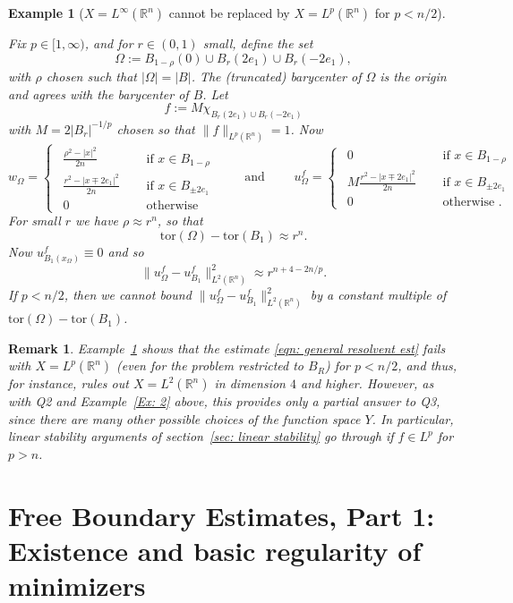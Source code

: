 \documentclass[10pt, reqno]{amsart}
\numberwithin{equation}{section}
\newtheorem{remark}[theorem]{Remark}
\newtheorem{example}[theorem]{Example}
\def\R{{\mathbb R}}
\def\W{\Omega}
\def\tor{\mathrm{tor}}
\begin{document}
\begin{example}[$X=L^{\infty}(\R^n)$ cannot be replaced by $X= L^p (\R^n)$ for $p<n/2$]\label{Ex: 3}
    {\rm
    Fix $p \in [1,\infty)$, and for $r\in (0,1)$ small, define the set
\[
\Omega:= B_{1-\rho}(0) \cup B_r(2e_1) \cup B_r(-2e_1),
\]
with $\rho$ chosen such that $|\Omega|=|B|$. The (truncated) barycenter of $\Omega$ is the origin and agrees with the barycenter of $B$. Let  
$$f:=M\chi_{B_r(2e_1)\cup B_r(-2e_1)}$$
with $M=2|B_r|^{-1/p}$ chosen so that $\|f \|_{L^p(\mathbb{R}^n)}=1$. Now 
\[
w_{\W}=
\begin{cases}
\ \  \frac{\rho^2-|x|^2}{2n} \quad &\text{ if } x \in B_{1-\rho} \\
\ \  \frac{r^2-|x\mp 2e_1|^2}{2n} \quad &\text{ if } x \in B_{\pm 2e_1} \\
\ \ 0 \quad &\text{ otherwise } 
\end{cases}
\qquad \text{ and } \qquad 
u_{\W}^f=
\begin{cases}
 \ \ 
 0 \quad &\text{ if } x \in B_{1-\rho} \\
 \ \ M\frac{r^2-|x\mp 2e_1|^2}{2n} \quad & \text{ if } x \in B_{\pm 2e_1} \\
  \ \ 0 \quad  &\text{ otherwise }. 
\end{cases}
\]
For small $r$ we have $\rho \approx r^n$, so that 
\[
\tor({\W})-\tor(B_1) \approx r^n. 
\]
Now $u_{B_1(x_{\W})}^f \equiv 0$ and so 
\[
 \|u_{\W}^f - u_{B_1}^f \|_{L^2(\mathbb{R}^n)}^2 \approx r^{n+4-2n/p}. 
\]
If $p< n/2$, then we cannot bound  $\|u_{\W}^f - u_{B_1}^f \|_{L^2(\mathbb{R}^n)}^2$ by a constant multiple of   $\tor(\W)-\tor(B_1)$. 

 }
\end{example}

\begin{remark}
    {\rm Example~\ref{Ex: 3} shows that the estimate \eqref{eqn: general resolvent est} fails with $X= L^p(\R^n)$ (even for the problem restricted to $B_R$) for $p<n/2$, and thus, for instance, rules out $X= L^2(\R^n)$ in dimension $4$ and higher. However,  as with Q2 and Example~\ref{Ex: 2} above, this provides only a partial  answer to Q3, since there are many other possible choices of the function space $Y$. In particular, linear stability arguments of section~\ref{sec: linear stability} go through if $f \in L^p$ for $p >n$.   
    }
\end{remark}




%
\section{Free Boundary Estimates, Part 1: Existence and basic regularity of minimizers}\label{sec: a priori and existence}
%
%
%
%
%
%
%
%
\end{document}

